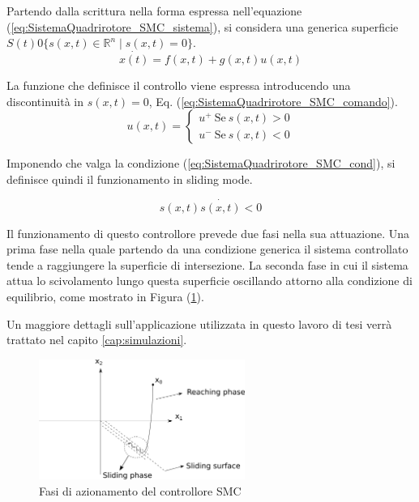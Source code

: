 Partendo dalla scrittura nella forma espressa nell'equazione (\ref{eq:SistemaQuadrirotore_SMC_sistema}), si considera una generica superficie $S(t) 0 \{ s(x,t) \in \mathbb{R}^n  \mid s(x,t) = 0\}$.
\begin{equation}\label{eq:SistemaQuadrirotore_SMC_sistema}
	\dot{x(t)} = f(x,t) +g(x,t) u(x,t)
\end{equation}

La funzione che definisce il controllo viene espressa introducendo una discontinuità in $s(x,t)=0$, Eq. (\ref{eq:SistemaQuadrirotore_SMC_comando}).
\begin{equation}\label{eq:SistemaQuadrirotore_SMC_comando}
	u(x,t) = \begin{cases}
		u^+ \ \text{Se} \ s(x,t) > 0 \\
		u^- \ \text{Se} \ s(x,t) < 0
	\end{cases}
\end{equation}

Imponendo che valga la condizione (\ref{eq:SistemaQuadrirotore_SMC_cond}), si definisce quindi il funzionamento in sliding mode.

\begin{equation}\label{eq:SistemaQuadrirotore_SMC_cond}
	s(x,t) \dot{s(x,t)} < 0
\end{equation}

Il funzionamento di questo controllore prevede due fasi nella sua attuazione. Una prima fase nella quale partendo da una condizione generica il sistema controllato tende a raggiungere la superficie di intersezione. La seconda fase in cui il sistema attua lo scivolamento lungo questa superficie oscillando attorno alla condizione di equilibrio, come mostrato in Figura (\ref{fig:SMC}).

Un maggiore dettagli sull'applicazione utilizzata in questo lavoro di tesi verrà trattato nel capito \ref{cap:simulazioni}.

\begin{figure}
	\centering
	\includegraphics[width=0.6\textwidth]{SistemaQuadrirotore/Figure/SMC_fasi}
	\caption{Fasi di azionamento del controllore SMC \cite{LiShihua2017AiVS}}
	\label{fig:SMC}
\end{figure}

